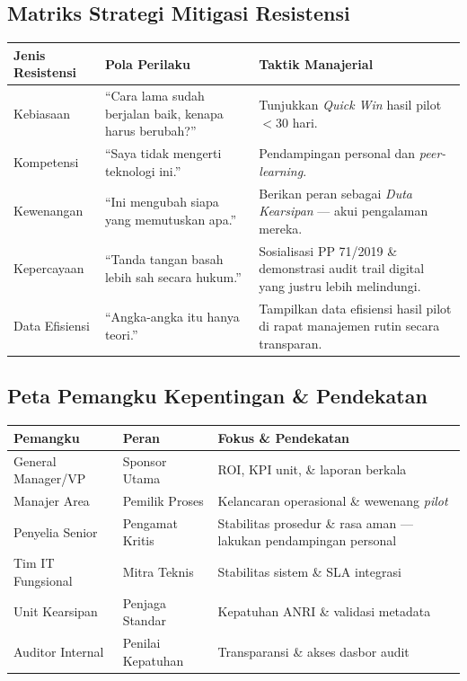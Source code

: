\documentclass[11pt,a4paper]{article}
\begin{document}
\subsection{Matriks Strategi Mitigasi Resistensi}
\begin{table}[h!]
\centering\small
\begin{tabularx}{\textwidth}{@{} l X X @{}}
\toprule
\textbf{Jenis Resistensi} & \textbf{Pola Perilaku} & \textbf{Taktik Manajerial} \\
\midrule
\rowcolor{plnorange!5}
Kebiasaan & ``Cara lama sudah berjalan baik, kenapa harus berubah?'' & Tunjukkan \textit{Quick Win} hasil pilot $<$30 hari. \\
Kompetensi & ``Saya tidak mengerti teknologi ini.'' & Pendampingan personal dan \textit{peer-learning}. \\
\rowcolor{plnorange!5}
Kewenangan & ``Ini mengubah siapa yang memutuskan apa.'' & Berikan peran sebagai \textit{Duta Kearsipan} --- akui pengalaman mereka. \\
Kepercayaan & ``Tanda tangan basah lebih sah secara hukum.'' & Sosialisasi PP 71/2019 \& demonstrasi audit trail digital yang justru lebih melindungi. \\
\rowcolor{plnorange!5}
Data Efisiensi & ``Angka-angka itu hanya teori.'' & Tampilkan data efisiensi hasil pilot di rapat manajemen rutin secara transparan. \\
\bottomrule
\end{tabularx}
\end{table}

\subsection{Peta Pemangku Kepentingan \& Pendekatan}
\begin{table}[h!]
\centering\small
\begin{tabularx}{\textwidth}{@{} l X X @{}}
\toprule
\textbf{Pemangku} & \textbf{Peran} & \textbf{Fokus \& Pendekatan} \\
\midrule
\rowcolor{plnblue!5}
General Manager/VP & Sponsor Utama & ROI, KPI unit, \& laporan berkala \\
Manajer Area & Pemilik Proses & Kelancaran operasional \& wewenang \textit{pilot} \\
\rowcolor{plnblue!5}
Penyelia Senior & Pengamat Kritis & Stabilitas prosedur \& rasa aman --- lakukan pendampingan personal \\
Tim IT Fungsional & Mitra Teknis & Stabilitas sistem \& SLA integrasi \\
\rowcolor{plnblue!5}
Unit Kearsipan & Penjaga Standar & Kepatuhan ANRI \& validasi metadata \\
Auditor Internal & Penilai Kepatuhan & Transparansi \& akses dasbor audit \\
\bottomrule
\end{tabularx}
\end{table}
\end{document}
